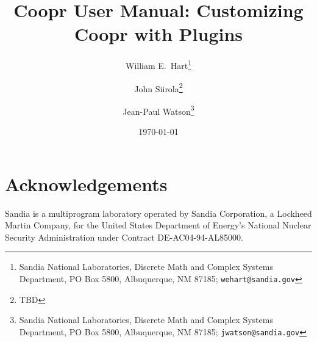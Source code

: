 \documentclass[12pt]{book}
\begin{document}
\title{Coopr User Manual: Customizing Coopr with Plugins}

\author{William E.\ Hart\footnote{Sandia National Laboratories, Discrete
Math and Complex Systems Department, PO Box 5800, Albuquerque, NM 87185;
{\tt wehart@sandia.gov}}
\and
John Siirola\footnote{TBD}
\and
Jean-Paul Watson\footnote{Sandia National Laboratories, Discrete
Math and Complex Systems Department, PO Box 5800, Albuquerque, NM 87185;
{\tt jwatson@sandia.gov}}
}

\date{\today}

\maketitle

\lstset{language=Python}
\lstset{aboveskip=1em,belowskip=1em}

\tableofcontents






\section*{Acknowledgements} 

Sandia is a multiprogram laboratory
operated by Sandia Corporation, a Lockheed Martin Company, for the United
States Department of Energy's National Nuclear Security Administration
under Contract DE-AC04-94-AL85000.




\end{document}

